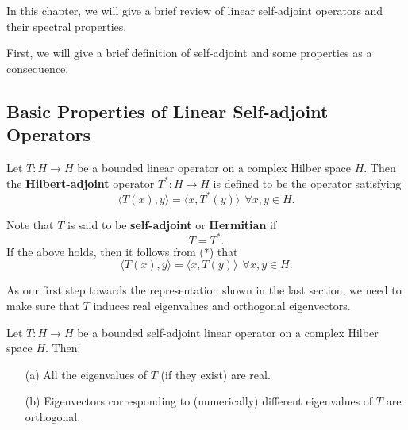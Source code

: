 In this chapter, we will give a brief review of linear self-adjoint operators and their spectral properties.

First, we will give a brief definition of self-adjoint and some properties as a consequence.

\subsection{Basic Properties of Linear Self-adjoint Operators}

\begin{definition}
    Let \( T: H \to H  \) be a bounded linear operator on  a complex Hilber space \( H  \). Then the \textbf{Hilbert-adjoint} operator \( T^{*} : H \to H  \) is defined to be the operator satisfying
    \[  \langle T(x) , y \rangle = \langle x ,  T^{*}(y) \rangle \ \ \forall x,y \in H. \tag{*}  \]
\end{definition}

Note that \( T  \) is said to be \textbf{self-adjoint} or \textbf{Hermitian} if 
\[  T = T^{*}. \]
If the above holds, then it follows from (*) that 
\[ \langle T(x) , y \rangle = \langle x  ,  T(y) \rangle \ \ \forall  x,y \in H.\]

As our first step towards the representation shown in the last section, we need to make sure that \( T  \) induces real eigenvalues and orthogonal eigenvectors.

\begin{theorem}\label{9.1-1}
    Let \( T: H \to H  \) be a bounded self-adjoint linear operator on a complex Hilber space \( H  \). Then:
    \begin{enumerate}
        \item[(a)] All the eigenvalues of \( T  \) (if they exist) are real.
        \item[(b)] Eigenvectors corresponding to (numerically) different eigenvalues of \( T  \) are orthogonal.
    \end{enumerate}
\end{theorem}

